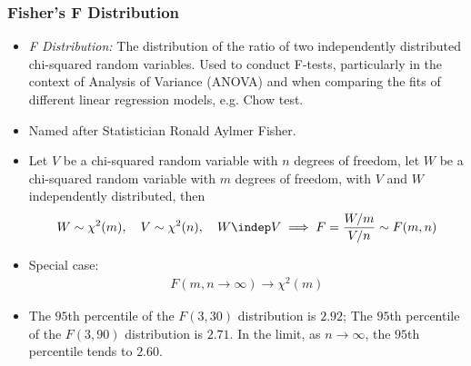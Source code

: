 

\begin{frame}
\frametitle{Fisher's F Distribution}
\begin{itemize}
\item \emph{F Distribution:} The distribution of the ratio of two independently distributed chi-squared random variables. Used to conduct F-tests, particularly in the context of Analysis of Variance (ANOVA) and when comparing the fits of different linear regression models, e.g. Chow test. 
\item Named after Statistician Ronald Aylmer Fisher.
\item Let $V$ be a chi-squared random variable with $n$ degrees of freedom, let $W$ be a chi-squared random variable with $m$ degrees of freedom, with $V$ and $W$ independently distributed, then
\begin{align*}
W \sim \chi^2 (m), 
\quad
V \sim \chi^2 (n),
\quad
W \indep V
\implies
F = \frac{W/m}{V/n} \sim F(m, n)
\end{align*}
\item Special case:
\begin{align*}
F(m, n\to\infty) \to  \chi^2(m)
\end{align*}
\item The $95$th percentile of the $F(3,30)$ distribution is $2.92$; The $95$th percentile of the $F(3,90)$ distribution is $2.71$. In the limit, as $n\to\infty$, the $95$th percentile tends to $2.60$.
\end{itemize}
\end{frame}
